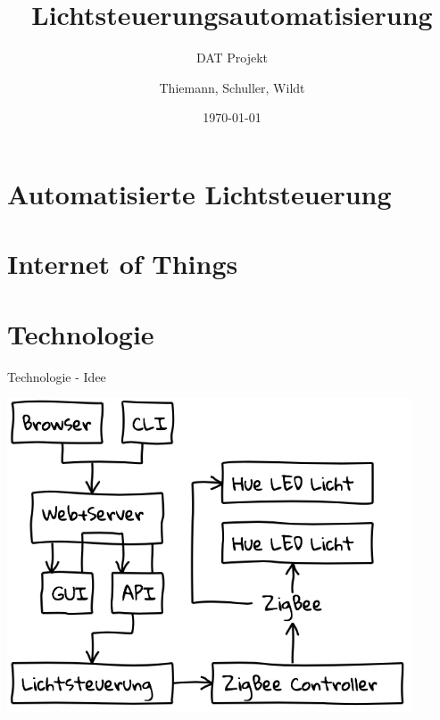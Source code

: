 \documentclass[10pt, compress]{beamer}
\title{Lichtsteuerungsautomatisierung}
\subtitle{DAT Projekt}
\date{\today}
\author{Thiemann, Schuller, Wildt}
\institute{Hochschule Rosenheim}
\begin{document}
\maketitle

\section{Automatisierte Lichtsteuerung}


\section{Internet of Things}

\section{Technologie}

\begin{frame}{Technologie - Idee}
  \begin{center}
    \includegraphics[width=0.9\textwidth]{images/grobarchitektur}
  \end{center}
\end{frame}
\end{document}
